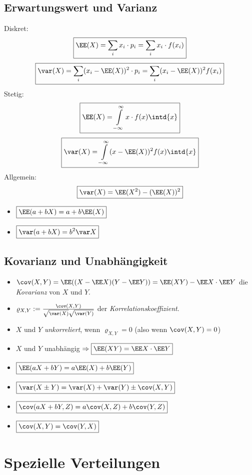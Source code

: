 \subsection{Erwartungswert und Varianz}
Diskret:
$$\boxed{\EE(X) = \sum_i x_i \cdot p_i = \sum_i x_i \cdot f(x_i)}$$
$$\boxed{\var(X)=\sum_i (x_i - \EE(X))^2 \cdot p_i = \sum_i (x_i - \EE(X))^2 f(x_i)}$$
Stetig:
$$\boxed{\EE(X) = \int\limits_{-\infty}^{\infty} x\cdot f(x) \intd{x}}$$
$$\boxed{\var (X) = \int\limits_{-\infty}^{\infty} (x-\EE(X))^2 f(x) \intd{x}}$$
Allgemein:
$$\boxed{\var (X) = \EE(X^2) - (\EE(X))^2}$$
\begin{itemize}
\item $\boxed{\EE(a+bX)=a+b\EE(X)}$
\item $\boxed{\var(a+bX) = b^2 \var X}$
\end{itemize}


\subsection{Kovarianz und Unabhängigkeit}
\begin{itemize}
\item $\cov(X,Y) = \EE((X-\EE X) ( Y - \EE Y)) = \EE (XY) - \EE X \cdot \EE Y$ die \emph{Kovarianz} von $X$ und $Y$.
\item $\varrho_{X,Y}:=\frac{\cov(X,Y)}{\sqrt{\var(X)}\sqrt{\var(Y)}}$ der \emph{Korrelationskoeffizient}.
\item $X$ und $Y$ \emph{unkorreliert}, wenn $\varrho_{X,Y}=0$ (also wenn $\cov(X,Y) = 0$)
\end{itemize}

\begin{itemize}
\item $X$ und $Y$ unabhängig $\Rightarrow \boxed{\EE(XY)=\EE X \cdot \EE Y}$
\end{itemize}

\begin{itemize}
\item $\boxed{\EE(aX+bY)=a\EE(X)+b\EE(Y)}$
\item $\boxed{\var(X\pm Y) = \var(X)+\var(Y)\pm \cov(X,Y)}$
\item $\boxed{\cov(aX+bY,Z)=a\cov(X,Z)+b\cov(Y,Z)}$
\item $\boxed{\cov(X,Y)=\cov(Y,X)}$
\end{itemize}

\section{Spezielle Verteilungen}
